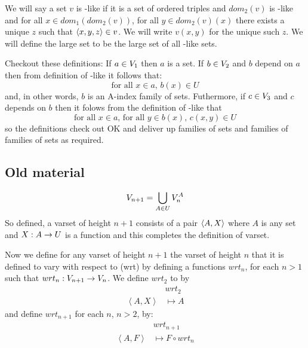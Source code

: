 \documentclass[10pt,a4paper]{scrartcl}
\begin{document}
\noindent
We will say a set $v$ is \varset[3]-like if it is a set of ordered triples and 
$dom_2(v)$ is \varset[2]-like and for all $x \in dom_1(dom_2(v))$, for all $y \in dom_2(v)(x)$ 
there exists a unique $z$ such that $\tuple{x,y,z} \in v$. We will write $v(x,y)$ for the
unique such $z$. We will define the large set \varset[3] to be the large set of  all \varset[3]-like sets.

\noindent
Checkout these definitions: If $a \in \varset[1]$ then $a$ is a set. If $b \in \varset[2]$ and
$b$ depend on $a$ then from definition of \varset[2]-like it follows that:
\begin{equation*}
\mbox{for all }x \in a \mbox{, } b(x) \in U
\end{equation*}  
and, in other words, $b$ is an A-index family of sets. Futhermore, if $c \in \varset[3]$
and $c$ depends on $b$ then it folows from the definition of \varset[3]-like that
\begin{equation*}
\mbox{for all }x \in a \mbox{, for all } y \in b(x) \mbox{, }c(x,y) \in U
\end{equation*}
so the definitions check out OK and deliver up families  of sets and families of families of sets as
required.

\subsection{Old material}
\begin{equation*}
\varset[n+1]=\bigcup_{A \in U}{\varset[n]^A}
\end{equation*}
So defined, a varset of height $n+1$ consists of a pair $\tuple{A,X}$ where
$A$ is any set and $X:A \morph U$ is a function and this completes the definition of varset.

\noindent
Now we define for any varset of height $n+1$ the varset of height $n$ that it is defined to vary with respect to (wrt) by defining a functions $wrt_n$, for each $n >1$ such that $wrt_n: \varset[n+1] \morph \varset[n]$. 
We define $wrt_2$ to by
\begin{align*}
  &wrt_{2}                                               \\
\left\langle A,X\right\rangle &\longmapsto A
\end{align*}
\noindent
and define   $wrt_{n+1}$ for each $n$, $n > 2$, by:
\begin{align*}
  &wrt_{n+1}                 \\
\left\langle A,F\right\rangle &\longmapsto F \circ wrt_n
\end{align*}
\end{document}
